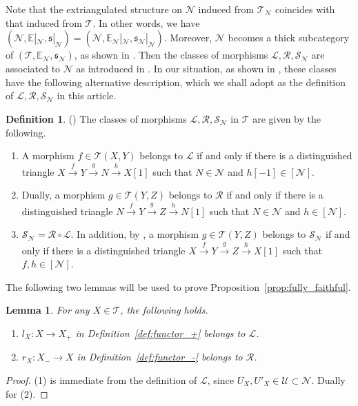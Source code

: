 \documentclass[a4paper,reqno,10pt]{amsart}
\DeclareRobustCommand{\darkblueedit}[1]{#1}
\newtheorem{lemma}[lemma]{Lemma}
\theoremstyle{definition}
\newtheorem{definition}[definition]{Definition}
\theoremstyle{definition}
\theoremstyle{definition}
\theoremstyle{definition}
\theoremstyle{plain}
\newcommand{\fs}{\mathfrak{s}}
\newcommand{\BE}{\mathbb{E}}
\newcommand{\CL}{\mathcal{L}}
\newcommand{\CN}{\mathcal{N}}
\newcommand{\CR}{\mathcal{R}}
\newcommand{\CT}{\mathcal{T}}
\newcommand{\CU}{\mathcal{U}}
\renewcommand{\SS}{\mathscr{S}}
\begin{document}
Note that the extriangulated structure on $\CN$ induced from $\CT_{\CN}$ coincides with that induced from $\CT$. In other words, we have
$(\CN, \BE|_\CN, \fs|_\CN) = (\CN, \BE_\CN|_\CN, \fs_\CN|_\CN)$.
Moreover, $\CN$ becomes a thick subcategory of $(\CT,\BE_{\CN},\fs_{\CN})$,
as shown in \cite[Corollary~2.8]{Oga24}.
\normalcolor
\darkblueedit{Then the classes of morphisms} $\CL,\CR,\SS_{\CN}$ are associated to $\CN$ as introduced in \cite[Definition~4.3]{NOS22}.
In our situation, \darkblueedit{as shown in \cite{Oga24},} these classes have the following alternative description, which we shall adopt as the definition of $\CL,\CR,\SS_{\CN}$ in this article.
\begin{definition}\label{def:LRS}(\cite[Lemmas~2.10 and~2.12]{Oga24})
The classes of morphisms $\CL,\CR,\SS_{\CN}$ in $\CT$ are given by the following.
\begin{enumerate}
\item A morphism $f\in\CT(X,Y)$ belongs to $\CL$ if and only if there is a distinguished triangle $X\xrightarrow{f}Y\xrightarrow{g}N\xrightarrow{h}X[1]$
such that $N\in\CN$ and $h[-1]\in [\CN]$.
\item Dually, a morphism $g\in\CT(Y,Z)$ belongs to $\CR$ if and only if there is a distinguished triangle $N\xrightarrow{f}Y\xrightarrow{g}Z\xrightarrow{h}N[1]$
such that $N\in\CN$ and $h\in [\CN]$.
\item $\SS_{\CN}=\CR\circ\CL$. In addition, by \cite[Proposition~2.11]{Oga24}, a morphism $g\in\CT(Y,Z)$ belongs to $\SS_{\CN}$ if and only if there is a distinguished triangle
$X\xrightarrow{f}Y\xrightarrow{g}Z\xrightarrow{h}X[1]$
such that $f,h\in [\CN]$.
\end{enumerate}
\end{definition}


The following two lemmas will be used to prove Proposition~\ref{prop:fully_faithful}.
\begin{lemma}\label{lem:fully_faithful1}
For any $X\in\CT$, the following holds.
\begin{enumerate}
\item $l_X\colon X\to X_+$ in Definition~\ref{def:functor_+} belongs to $\CL$.
\item $r_X\colon X_-\to X$ in Definition~\ref{def:functor_-} belongs to $\CR$.
\end{enumerate}
\end{lemma}
\begin{proof}
{\rm (1)} is immediate from the definition of $\CL$, since $U_X,U'_X\in\CU\subset\CN$. Dually for {\rm (2)}. 
\end{proof}
\end{document}
